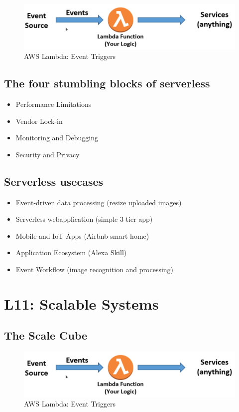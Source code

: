 \documentclass[a4paper]{article}
\begin{document}
\begin{multicols}{3}
\begin{figure}[H]
    \includegraphics[width=\linewidth]{AWSLambdaTrigger.png}
    \caption{AWS Lambda: Event Triggers}
    \label{fig:awslambda}
\end{figure}

\subsection*{The four stumbling blocks of serverless}
\begin{itemize}
    \item Performance Limitations
    \item Vendor Lock-in
    \item Monitoring and Debugging
    \item Security and Privacy
\end{itemize}

\subsection*{Serverless usecases}
\begin{itemize}
    \item Event-driven data processing (resize uploaded images)
    \item Serverless webapplication (simple 3-tier app)
    \item Mobile  and IoT Apps (Airbnb smart home)
    \item Application Ecosystem (Alexa Skill)
    \item Event Workflow (image recognition and processing)
\end{itemize}

\section*{L11: Scalable Systems}

\subsection*{The Scale Cube}
\begin{figure}[H]
    \includegraphics[width=\linewidth]{AWSLambdaTrigger.png}
    \caption{AWS Lambda: Event Triggers}
    \label{fig:awslambda}
\end{figure}


\end{multicols}
\end{document}
